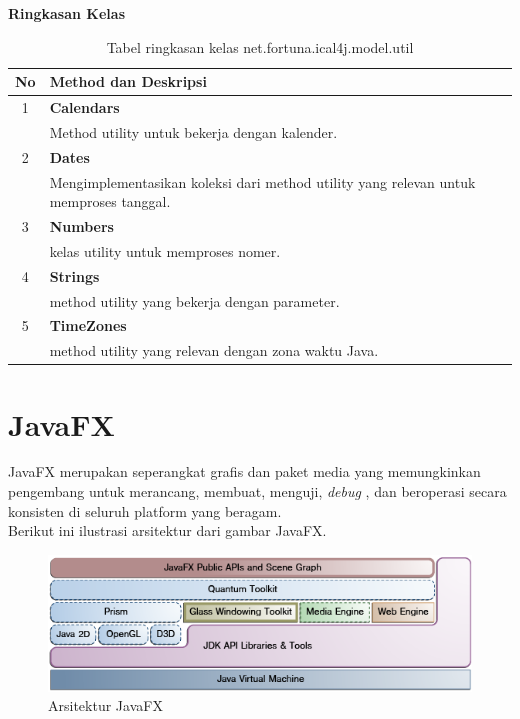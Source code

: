 	\noindent \textbf{Ringkasan Kelas}\cite{ical}
	\begin{table}[H]
		\centering
		\caption{Tabel ringkasan kelas net.fortuna.ical4j.model.util}
		\label{tab:kelas_net.fortuna.ical4j.model.util}
	\begin{tabular}{|c|p{12cm}|}
		\hline
		\textbf{No} & \textbf{Method dan Deskripsi} \\ \hline \hline
		1 & \textbf{Calendars}\\
			&	Method utility untuk bekerja dengan kalender.\\ \hline
		2 & \textbf{Dates}\\
			&	Mengimplementasikan koleksi dari method utility yang relevan untuk memproses tanggal. \\ \hline
		3 & \textbf{Numbers}\\
			&	kelas utility untuk memproses nomer. \\ \hline
		4 & \textbf{Strings}\\
			&	method utility yang bekerja dengan parameter. \\ \hline
		5 & \textbf{TimeZones}\\
			&	method utility yang relevan dengan zona waktu Java. \\ \hline
		\end{tabular}
\end{table}

\section{JavaFX}
\label{sec:JavaFX}
JavaFX merupakan seperangkat grafis dan paket media yang memungkinkan pengembang untuk merancang, membuat, menguji, \textit{debug} , dan  beroperasi secara konsisten di seluruh platform yang beragam.\cite{javafx2}\\
Berikut ini ilustrasi arsitektur dari gambar JavaFX.
\begin{figure}[H]
	\centering
	\includegraphics[scale=0.7]{Gambar/arsitekturJavaFX}
	\caption{Arsitektur JavaFX}
	\end{figure}
	
